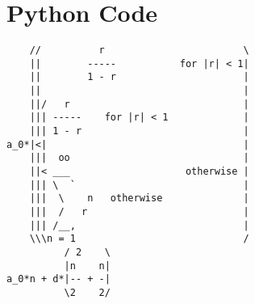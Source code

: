 \section{Python Code}

\begin{notepad}\scriptsize
\begin{verbatim}
    //          r                        \
    ||        -----           for |r| < 1|
    ||        1 - r                      |
    ||                                   |
    ||/   r                              |
    ||| -----    for |r| < 1             |
    ||| 1 - r                            |
a_0*|<|                                  |
    |||  oo                              |
    ||< ___                    otherwise |
    ||| \  `                             |
    |||  \    n   otherwise              |
    |||  /   r                           |
    ||| /__,                             |
    \\\n = 1                             /
          / 2    \
          |n    n|
a_0*n + d*|-- + -|
          \2    2/
\end{verbatim}
\end{notepad}
